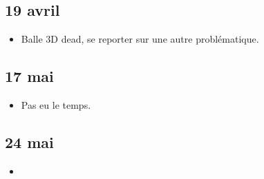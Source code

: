 \documentclass[a4paper, 11pt, final, garamond]{book}
\begin{document}
\subsection{19 avril}
\begin{itemize}
	\item Balle 3D dead, se reporter sur une autre problématique.
\end{itemize}

\subsection{17 mai}
\begin{itemize}
	\item Pas eu le temps.
\end{itemize}

\subsection{24 mai}
\begin{itemize}
	\item
\end{itemize}
\end{document}

